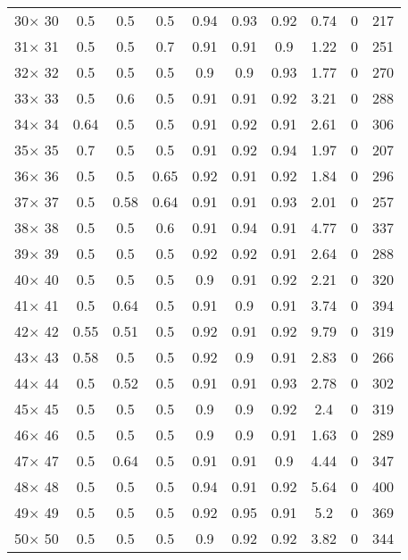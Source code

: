 \documentclass[main.tex]{subfiles}
\begin{document}
\begin{table}
\begin{tabular}{|c|c|c|c|c|c|c|c|c|c|}
30$\times$ 30 &0.5 &0.5 &0.5 &0.94 &0.93 &0.92 &0.74 &0 &217\\
31$\times$ 31 &0.5 &0.5 &0.7 &0.91 &0.91 &0.9 &1.22 &0 &251\\
32$\times$ 32 &0.5 &0.5 &0.5 &0.9 &0.9 &0.93 &1.77 &0 &270\\
33$\times$ 33 &0.5 &0.6 &0.5 &0.91 &0.91 &0.92 &3.21 &0 &288\\
34$\times$ 34 &0.64 &0.5 &0.5 &0.91 &0.92 &0.91 &2.61 &0 &306\\
35$\times$ 35 &0.7 &0.5 &0.5 &0.91 &0.92 &0.94 &1.97 &0 &207\\
36$\times$ 36 &0.5 &0.5 &0.65 &0.92 &0.91 &0.92 &1.84 &0 &296\\
37$\times$ 37 &0.5 &0.58 &0.64 &0.91 &0.91 &0.93 &2.01 &0 &257\\
38$\times$ 38 &0.5 &0.5 &0.6 &0.91 &0.94 &0.91 &4.77 &0 &337\\
39$\times$ 39 &0.5 &0.5 &0.5 &0.92 &0.92 &0.91 &2.64 &0 &288\\
40$\times$ 40 &0.5 &0.5 &0.5 &0.9 &0.91 &0.92 &2.21 &0 &320\\
41$\times$ 41 &0.5 &0.64 &0.5 &0.91 &0.9 &0.91 &3.74 &0 &394\\
42$\times$ 42 &0.55 &0.51 &0.5 &0.92 &0.91 &0.92 &9.79 &0 &319\\
43$\times$ 43 &0.58 &0.5 &0.5 &0.92 &0.9 &0.91 &2.83 &0 &266\\
44$\times$ 44 &0.5 &0.52 &0.5 &0.91 &0.91 &0.93 &2.78 &0 &302\\
45$\times$ 45 &0.5 &0.5 &0.5 &0.9 &0.9 &0.92 &2.4 &0 &319\\
46$\times$ 46 &0.5 &0.5 &0.5 &0.9 &0.9 &0.91 &1.63 &0 &289\\
47$\times$ 47 &0.5 &0.64 &0.5 &0.91 &0.91 &0.9 &4.44 &0 &347\\
48$\times$ 48 &0.5 &0.5 &0.5 &0.94 &0.91 &0.92 &5.64 &0 &400\\
49$\times$ 49 &0.5 &0.5 &0.5 &0.92 &0.95 &0.91 &5.2 &0 &369\\
50$\times$ 50 &0.5 &0.5 &0.5 &0.9 &0.92 &0.92 &3.82 &0 &344\\
    \hline
    \end{tabular}
\end{table}
\end{document}
